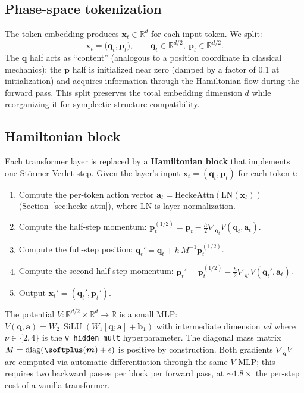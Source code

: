 \documentclass[11pt]{article}
\newcommand{\R}{\mathbb{R}}
\newcommand{\qphase}{q}
\newcommand{\pphase}{p}
\DeclareMathOperator{\SiLU}{SiLU}
\DeclareMathOperator{\diag}{diag}
\begin{document}
\subsection{Phase-space tokenization}

The token embedding produces $\bm{x}_t \in \R^d$ for each input token.
We split:
\begin{equation}
\bm{x}_t = \big(\bm{\qphase}_t, \bm{\pphase}_t\big), \qquad
\bm{\qphase}_t \in \R^{d/2}, \ \bm{\pphase}_t \in \R^{d/2}.
\end{equation}
The $\bm{\qphase}$ half acts as ``content'' (analogous to a position
coordinate in classical mechanics); the $\bm{\pphase}$ half is initialized
near zero (damped by a factor of $0.1$ at initialization) and acquires
information through the Hamiltonian flow during the forward pass.
This split preserves the total embedding dimension $d$ while reorganizing
it for symplectic-structure compatibility.

\subsection{Hamiltonian block}

Each transformer layer is replaced by a \textbf{Hamiltonian block} that
implements one Störmer-Verlet step. Given the layer's input
$\bm{x}_t = (\bm{\qphase}_t, \bm{\pphase}_t)$ for each token $t$:

\begin{enumerate}[leftmargin=*]
\item Compute the per-token action vector
$\bm{a}_t = \mathrm{HeckeAttn}(\mathrm{LN}(\bm{x}_t))$
(Section~\ref{sec:hecke-attn}), where $\mathrm{LN}$ is layer
normalization.
\item Compute the half-step momentum:
$\bm{\pphase}_t^{(1/2)} = \bm{\pphase}_t - \tfrac{h}{2} \nabla_{\bm{\qphase}_t}
V(\bm{\qphase}_t, \bm{a}_t)$.
\item Compute the full-step position:
$\bm{\qphase}_t' = \bm{\qphase}_t + h \, M^{-1} \bm{\pphase}_t^{(1/2)}$.
\item Compute the second half-step momentum:
$\bm{\pphase}_t' = \bm{\pphase}_t^{(1/2)} - \tfrac{h}{2}
\nabla_{\bm{\qphase}'} V(\bm{\qphase}_t', \bm{a}_t)$.
\item Output $\bm{x}_t' = (\bm{\qphase}_t', \bm{\pphase}_t')$.
\end{enumerate}

The potential $V: \R^{d/2} \times \R^d \to \R$ is a small MLP:
$V(\bm{\qphase}, \bm{a}) = W_2 \, \SiLU(W_1 [\bm{\qphase}; \bm{a}] + \bm{b}_1)$
with intermediate dimension $\nu d$ where $\nu \in \{2, 4\}$ is the
\texttt{v\_hidden\_mult} hyperparameter. The diagonal mass matrix
$M = \diag(\softplus(\bm{m}) + \epsilon)$ is positive by construction.
Both gradients $\nabla_{\bm{\qphase}} V$ are computed via automatic
differentiation through the same $V$ MLP; this requires two backward
passes per block per forward pass, at $\sim 1.8\times$ the per-step cost
of a vanilla transformer.
\end{document}
